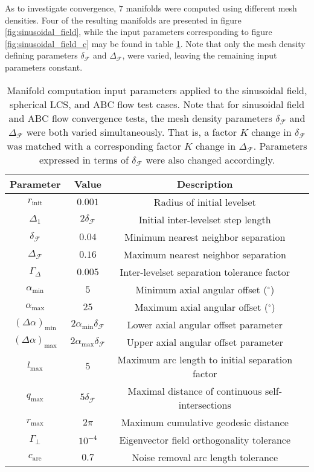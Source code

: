 As to investigate convergence, $7$ manifolds were computed using different mesh densities. Four of the resulting manifolds are presented in figure \ref{fig:sinusoidal_field}, while the input parameters corresponding to figure \ref{fig:sinusoidal_field_c} may be found in table \ref{tab:manifold_parameters}. Note that only the mesh density defining parameters $\delta_{\mathcal{F}}$ and $\Delta_{\mathcal{F}}$, were varied, leaving the remaining input parameters constant.

\begin{table}[h!]
\begin{center}
\caption{Manifold computation input parameters applied to the sinusoidal field, spherical LCS, and ABC flow test cases. Note that for sinusoidal field and ABC flow convergence tests, the mesh density parameters $\delta_{\mathcal{F}}$ and $\Delta_{\mathcal{F}}$ were both varied simultaneously. That is, a factor $K$ change in $\delta_{\mathcal{F}}$ was matched with a corresponding factor $K$ change in $\Delta_{\mathcal{F}}$. Parameters expressed in terms of $\delta_{\mathcal{F}}$ were also changed accordingly.}\label{tab:manifold_parameters}
\bigskip
\begin{tabular}{cccc}
\hline
Parameter & Value & Description\\
\hline
$r_{\text{init}}$ & $0.001$ & Radius of initial levelset\\
$\Delta_{1}$ & $2\delta_{\mathcal{F}}$ & Initial inter-levelset step length\\
$\delta_{\mathcal{F}}$ & $0.04$ & Minimum nearest neighbor separation\\
$\Delta_{\mathcal{F}}$ & $0.16$ & Maximum nearest neighbor separation \\
$\Gamma_{\Delta}$ & $0.005$ & Inter-levelset separation tolerance factor\\
$\alpha_{\text{min}}$ & $5$ & Minimum axial angular offset ($^{\circ}$)\\
$\alpha_{\text{max}}$ & $25$ & Maximum axial angular offset ($^{\circ}$) \\
$(\Delta \alpha)_{\text{min}}$ & $2\alpha_{\text{min}}\delta_{\mathcal{F}}$ & Lower axial angular offset parameter\\
$(\Delta \alpha)_{\text{max}}$ & $2\alpha_{\text{max}}\delta_{\mathcal{F}}$ & Upper axial angular offset parameter\\
$l_{\text{max}}$ & $5$ & Maximum arc length to initial separation factor\\
$q_{\text{max}}$ & $5\delta_{\mathcal{F}}$ & Maximal distance of continuous self-intersections\\
$r_{\text{max}}$ & $2\pi$ & Maximum cumulative geodesic distance\\
$\Gamma_{\perp}$ & $10^{-4}$ & Eigenvector field orthogonality tolerance\\
$c_{\text{arc}}$ & $0.7$ & Noise removal arc length tolerance\\

\hline
\end{tabular}
\end{center}
\end{table}

